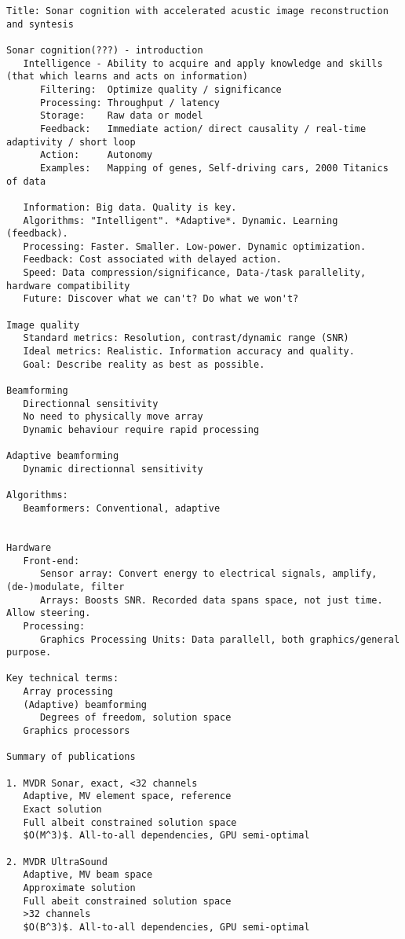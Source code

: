 \begin{lstlisting}
Title: Sonar cognition with accelerated acustic image reconstruction and syntesis

Sonar cognition(???) - introduction
   Intelligence - Ability to acquire and apply knowledge and skills (that which learns and acts on information)
      Filtering:  Optimize quality / significance
      Processing: Throughput / latency
      Storage:    Raw data or model
      Feedback:   Immediate action/ direct causality / real-time adaptivity / short loop
      Action:     Autonomy
      Examples:   Mapping of genes, Self-driving cars, 2000 Titanics of data
      
   Information: Big data. Quality is key.
   Algorithms: "Intelligent". *Adaptive*. Dynamic. Learning (feedback).
   Processing: Faster. Smaller. Low-power. Dynamic optimization. 
   Feedback: Cost associated with delayed action. 
   Speed: Data compression/significance, Data-/task parallelity, hardware compatibility  
   Future: Discover what we can't? Do what we won't?
   
Image quality
   Standard metrics: Resolution, contrast/dynamic range (SNR)
   Ideal metrics: Realistic. Information accuracy and quality.
   Goal: Describe reality as best as possible.
   
Beamforming
   Directionnal sensitivity
   No need to physically move array
   Dynamic behaviour require rapid processing

Adaptive beamforming
   Dynamic directionnal sensitivity

Algorithms:
   Beamformers: Conventional, adaptive
   

Hardware
   Front-end: 
      Sensor array: Convert energy to electrical signals, amplify, (de-)modulate, filter
      Arrays: Boosts SNR. Recorded data spans space, not just time. Allow steering.
   Processing:
      Graphics Processing Units: Data parallell, both graphics/general purpose.
      
Key technical terms:
   Array processing
   (Adaptive) beamforming
      Degrees of freedom, solution space
   Graphics processors

Summary of publications

1. MVDR Sonar, exact, <32 channels
   Adaptive, MV element space, reference
   Exact solution
   Full albeit constrained solution space
   $O(M^3)$. All-to-all dependencies, GPU semi-optimal
    
2. MVDR UltraSound
   Adaptive, MV beam space
   Approximate solution
   Full abeit constrained solution space 
   >32 channels
   $O(B^3)$. All-to-all dependencies, GPU semi-optimal
   

\end{lstlisting}
